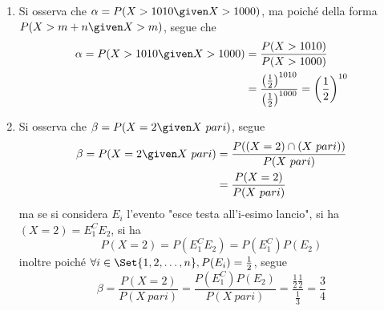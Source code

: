 \documentclass{subfiles}
\begin{document}
\begin{Example*}
\begin{enumerate}
        \item Si osserva che \(\alpha = P(X > 1010 \given X > 1000)\), ma poiché della forma \(P(X > m + n  \given X > m)\), segue che
              \[\begin{aligned}
                      \alpha = P(X > 1010 \given X > 1000) & = \frac{P(X > 1010)}{P(X > 1000)}                                                                         \\
                                                           & = \frac{\left(\frac{1}{2}\right)^{1010}}{\left(\frac{1}{2}\right)^{1000}} = \left(\frac{1}{2}\right)^{10}
                  \end{aligned}\]

        \item Si osserva che \(\beta = P(X = 2 \given X \ pari)\), segue
              \[\begin{aligned}
                      \beta = P(X = 2 \given X \ pari) & = \frac{P((X = 2) \cap (X \ pari))}{P(X \ pari)} \\
                                                       & = \frac{P(X = 2)}{P(X \ pari)}
                  \end{aligned}\]
              ma se si considera \(E_{i}\) l'evento "esce testa all'i-esimo lancio", si ha \((X = 2) = E_{1}^{C}E_{2}\), si ha
              \[
                  P(X = 2) = P(E_{1}^{C}E_{2}) = P(E_{1}^{C})P(E_{2})
              \]
              inoltre poiché \(\forall i \in \Set{1, 2, \dots, n}, P(E_{i}) = \tfrac{1}{2}\), segue
              \[
                  \beta = \frac{P(X = 2)}{P(X \ pari)} = \frac{P(E_{1}^{C})P(E_{2})}{P(X \ pari)} = \frac{\frac{1}{2} \frac{1}{2}}{\frac{1}{3}} = \frac{3}{4}
              \]
    \end{enumerate}
\end{Example*}
\clearpage
\end{document}
